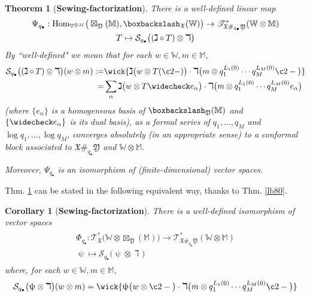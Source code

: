 \documentclass[11pt,b5paper,notitlepage]{article}
\theoremstyle{definition}
\theoremstyle{plain}
\newtheorem{thm}[df]{Theorem}
\newtheorem{co}[df]{Corollary}
\newcommand{\fk}{\mathfrak}
\newcommand{\mc}{\mathcal}
\newcommand{\wch}{\widecheck}
\newcommand{\Hom}{\mathrm{Hom}}
\newcommand{\scr}{\mathscr}
\newcommand{\blt}{\bullet}
\newcommand{\Vbb}{\mathbb V}
\newcommand{\Wbb}{\mathbb W}
\newcommand{\Mbb}{\mathbb M}
\newcommand{\<}{\left\langle}
\renewcommand{\>}{\right\rangle}
\newcommand{\fx}{\mathfrak{X}}
\newcommand{\bbs}{\boxbackslash}
\numberwithin{equation}{section}
\begin{document}
\begin{thm}[\textbf{Sewing-factorization}]\label{lb81}
There is a well-defined linear map
\begin{gather}
\begin{gathered}
\Psi_{q_\blt}: \Hom_{\Vbb^{\otimes M}}\big(\boxtimes_{\fk Y}(\Mbb),\bbs_\fx(\Wbb)\big) \rightarrow\scr T_{\fk X\#_{q_\blt}\fk Y}^*(\Wbb\otimes\Mbb)\\
T\mapsto \mc S_{q_\blt}\big((\gimel\circ T)\otimes \daleth\big)
\end{gathered}
\end{gather}
By ``well-defined" we mean that for each $w\in\Wbb,m\in\Mbb$,
\begin{align}
\begin{aligned}
\mc S_{q_\blt}\big((\gimel\circ T)\otimes \daleth\big)(w\otimes m):=&\wick{\gimel\big(w\otimes T(\c2-)\big)\cdot \daleth\big(m\otimes q_1^{L_1(0)}\cdots q_M^{L_M(0)}\c2-\big)}\\
=&\sum_{\alpha} \gimel\big(w\otimes T\wch e_\alpha\big)\cdot \daleth\big(m\otimes q_1^{L_1(0)}\cdots q_M^{L_M(0)}e_\alpha\big)
\end{aligned}
\end{align}
(where $\{e_\alpha\}$ is a homogeneous basis of $\bbs_{\fk Y}(\Mbb)$ and $\{\wch e_\alpha\}$ is its dual basis), as a formal series of $q_1,\dots,q_M$ and $\log q_1,\dots,\log q_M$, converges absolutely (in an appropriate sense) to a conformal block associated to $\fx\#_{q_\blt}\fk Y$ and $\Wbb\otimes\Mbb$. 

Moreover, $\Psi_{q_\blt}$ is an isomorphism of (finite-dimensional) vector spaces. 
\end{thm}

Thm. \ref{lb81} can be stated in the following equivalent way, thanks to Thm. \ref{lb80}.

\begin{co}[\textbf{Sewing-factorization}]\label{lb82}
There is a well-defined isomorphism of vector spaces
\begin{gather}
\begin{gathered}
\Phi_{q_\blt}: \scr T_\fx^*\big(\Wbb\otimes\boxtimes_{\fk Y}(\Mbb)\big) \rightarrow\scr T_{\fk X\#_{q_\blt}\fk Y}^*(\Wbb\otimes\Mbb)\\
\uppsi\mapsto \mc S_{q_\blt}\big(\uppsi\otimes \daleth\big)
\end{gathered}
\end{gather}
where, for each $w\in\Wbb,m\in\Mbb$,
\begin{align}
\mc S_{q_\blt}\big(\uppsi\otimes \daleth\big)(w\otimes m)=\wick{\uppsi\big(w\otimes \c2-\big)\cdot \daleth\big(m\otimes q_1^{L_1(0)}\cdots q_M^{L_M(0)}\c2-\big)}
\end{align}
\end{co}
\end{document}
